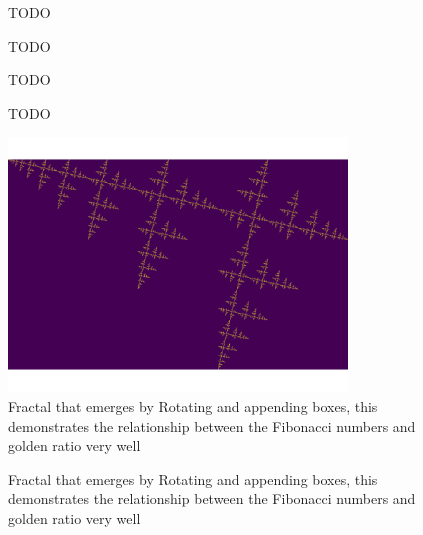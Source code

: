 \documentclass[11pt]{article}
\begin{document}
\begin{figure}[htbp]
\centering

\caption{\label{My-Frac-GR}TODO}
\end{figure}

\begin{figure}[htbp]
\centering

\caption{\label{My-Frac-GR}TODO}
\end{figure}

\begin{figure}[htbp]
\centering

\caption{\label{My-Frac-GR}TODO}
\end{figure}

\begin{figure}[htbp]
\centering

\caption{\label{My-Frac-GR}TODO}
\end{figure}

\begin{figure}[htbp]
\centering
\includegraphics[width=9cm]{../Problems/fractal-dimensions/my-self-rep-frac-GR.png}
\caption{\label{My-Frac-GR}Fractal that emerges by Rotating and appending boxes, this demonstrates the relationship between the Fibonacci numbers and golden ratio very well}
\end{figure}

\begin{figure}[htbp]
\centering

\caption{\label{My-Frac-GR}Fractal that emerges by Rotating and appending boxes, this demonstrates the relationship between the Fibonacci numbers and golden ratio very well}
\end{figure}
\end{document}
